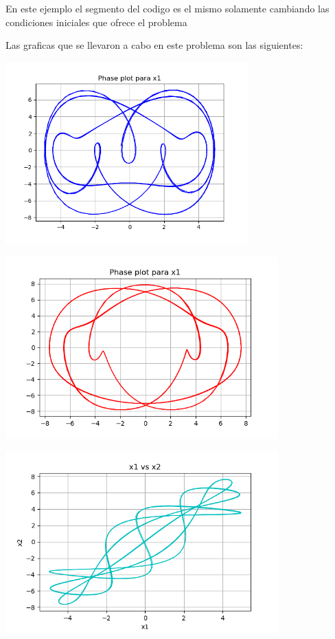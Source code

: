 \documentclass{article}
\begin{document}
En este ejemplo el segmento del codigo es el mismo solamente cambiando las condiciones iniciales que ofrece el problema

Las graficas que se llevaron a cabo en este problema son las siguientes:


\begin{center}
\includegraphics[height=7cm]{nolineal3_2_1.png}
\end{center}

\begin{center}
\includegraphics[height=7cm]{nolineal3_2_2.png}
\end{center}

\begin{center}
\includegraphics[height=7cm]{nolineal3_2_3.png}
\end{center}
\end{document}

